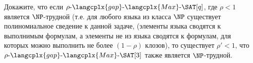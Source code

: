 Докажите, что если $\rho\text{-}\langcplx{gap}\text{-}\langcplx{Max}\text{-}\SAT[q]$, где $\rho < 1$
является $\NP$-трудной (т.е. для любого языка из класса $\NP$ существует полиномиальное сведение к данной
задаче, (элементы языка сводятся к выполнимым формулам, а элементы не из языка сводятся к формулам, для
которых можно выполнить не более $(1 - \rho)$ клозов), то существует $\rho' < 1$, что
$\rho\text{-}\langcplx{gap}\text{-}\langcplx{Max}\text{-}\SAT[3]$ также является $\NP$-трудной.
